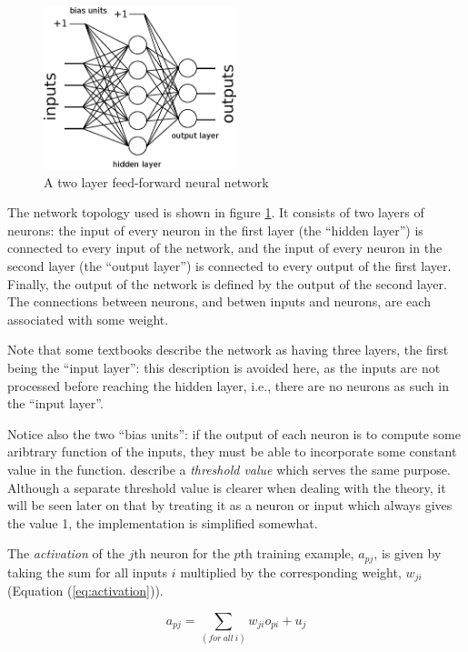 \begin{figure}[ht]
\centering
\includegraphics[width=0.5\textwidth]{diagrams/neuralnet}
\caption{A two layer feed-forward neural network}
\label{fig:neuralnet}
\end{figure}

The network topology used is shown in figure \ref{fig:neuralnet}.  It consists of two layers of neurons: the input of every neuron in the first layer (the ``hidden layer'') is connected to every input of the network, and the input of every neuron in the second layer (the ``output layer'') is connected to every output of the first layer.  Finally, the output of the network is defined by the output of the second layer.  The connections between neurons, and betwen inputs and neurons, are each associated with some weight.

Note that some textbooks describe the network as having three layers, the first being the ``input layer'': this description is avoided here, as the inputs are not processed before reaching the hidden layer, i.e., there are no neurons as such in the ``input layer''.

Notice also the two ``bias units'': if the output of each neuron is to compute some aribtrary function of the inputs, they must be able to incorporate some constant value in the function.   \citet{Aleksander1995} describe a \emph{threshold value} which serves the same purpose.  Although a separate threshold value is clearer when dealing with the theory, it will be seen later on that by treating it as a neuron or input which always gives the value 1, the implementation is simplified somewhat.

The \emph{activation} of the $j$th neuron for the $p$th training example, $a_{pj}$, is given by taking the sum for all inputs $i$ multiplied by the corresponding weight, $w_{ji}$ (Equation (\ref{eq:activation})).

\begin{equation}
a_{pj} = \sum_{(for~all~i)} w_{ji}o_{pi} + u_j
\label{eq:activation}
\end{equation}

